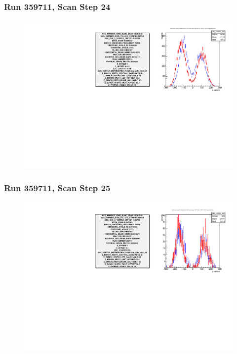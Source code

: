 \begin{frame}
\frametitle{Run 359711, Scan Step 24}
\begin{figure}
\begin{center}
\includegraphics[width=\linewidth]{"figures/359711_step_24_zdc_zvertex"}
\caption{ }
\label{fig:359711_step_24_zdc_zvertex}
\end{center}\end{figure}
\end{frame}

\begin{frame}
\frametitle{Run 359711, Scan Step 25}
\begin{figure}
\begin{center}
\includegraphics[width=\linewidth]{"figures/359711_step_25_zdc_zvertex"}
\caption{ }
\label{fig:359711_step_25_zdc_zvertex}
\end{center}\end{figure}
\end{frame}


